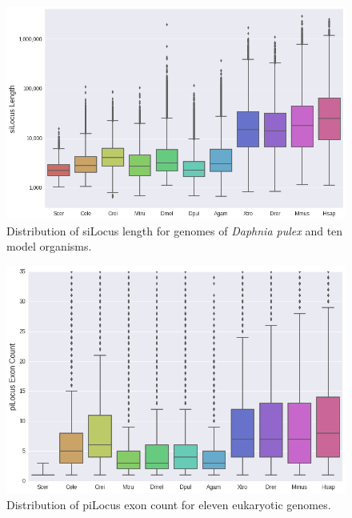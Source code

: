 \clearpage


\setcounter{figure}{0}
\makeatletter
\renewcommand{\thefigure}{S\@arabic\c@figure}
\makeatother

\begin{figure}[h]
\includegraphics[scale=0.4]{Assets/Graphics/iLoci/modorg-silocus-length.png}
\caption{Distribution of siLocus length for genomes of \textit{Daphnia pulex} and ten model organisms.}
\label{Fig:siLocusLengthModOrg}
\end{figure}

\begin{figure}[h]
\includegraphics[scale=0.4]{Assets/Graphics/iLoci/modorg-pilocus-exoncount.png}
\caption{Distribution of piLocus exon count for eleven eukaryotic genomes.}
\label{Fig:piLocusExonCount}
\end{figure}

